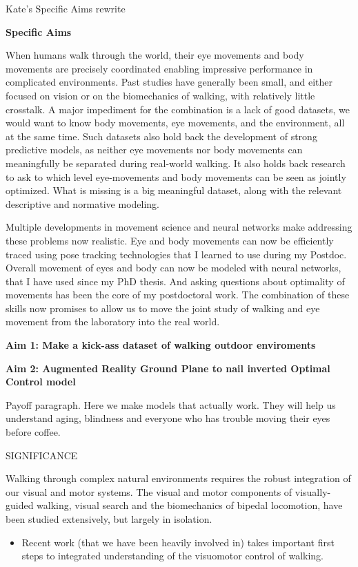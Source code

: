 \documentclass[
]{article}
\begin{document}
Kate's Specific Aims rewrite

\textbf{Specific Aims}

When humans walk through the world, their eye movements and body
movements are precisely coordinated enabling impressive performance in
complicated environments. Past studies have generally been small, and
either focused on vision or on the biomechanics of walking, with
relatively little crosstalk. A major impediment for the combination is a
lack of good datasets, we would want to know body movements, eye
movements, and the environment, all at the same time. Such datasets also
hold back the development of strong predictive models, as neither eye
movements nor body movements can meaningfully be separated during
real-world walking. It also holds back research to ask to which level
eye-movements and body movements can be seen as jointly optimized. What
is missing is a big meaningful dataset, along with the relevant
descriptive and normative modeling.

Multiple developments in movement science and neural networks make
addressing these problems now realistic. Eye and body movements can now
be efficiently traced using pose tracking technologies that I learned to
use during my Postdoc. Overall movement of eyes and body can now be
modeled with neural networks, that I have used since my PhD thesis. And
asking questions about optimality of movements has been the core of my
postdoctoral work. The combination of these skills now promises to allow
us to move the joint study of walking and eye movement from the
laboratory into the real world.

\textbf{Aim 1: Make a kick-ass dataset of walking outdoor enviroments}

\textbf{Aim 2: Augmented Reality Ground Plane to nail inverted Optimal
Control model}

Payoff paragraph. Here we make models that actually work. They will help
us understand aging, blindness and everyone who has trouble moving their
eyes before coffee.

SIGNIFICANCE

Walking through complex natural environments requires the robust
integration of our visual and motor systems. The visual and motor
components of visually-guided walking, visual search and the
biomechanics of bipedal locomotion, have been studied extensively, but
largely in isolation.

\begin{itemize}
\item
  Recent work (that we have been heavily involved in) takes important
  first steps to integrated understanding of the visuomotor control of
  walking.
\end{itemize}
\end{document}
